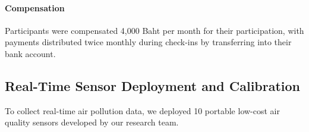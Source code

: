 

\paragraph{Compensation}
Participants were compensated 4,000 Baht per month for their participation, with payments distributed twice monthly during check-ins by transferring into their bank account.

\subsection{Real-Time Sensor Deployment and Calibration}

To collect real-time air pollution data, we deployed 10 portable low-cost air quality sensors developed by our research team.




